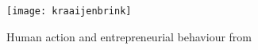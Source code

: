 \begin{figure}
	\centering
	\texttt{[image: kraaijenbrink]}
	\caption{Human action and entrepreneurial behaviour from \citet{doi:10.1108/S1876-0228(2012)0000009015}}
	\label{fig:kraaijenbrink}
\end{figure}

%

 
